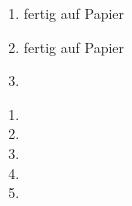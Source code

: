 \documentclass{homework}
\date{Montag, dem 19. November 2012}
\author{Stefan Meißner (4279113) und Niels Hoppe (4356370)}
\begin{document}
\maketitle
\begin{enumerate} 

\begin{enumerate}
\item fertig auf Papier
\item fertig auf Papier
\item
\end{enumerate}

\begin{enumerate}
\item
\item
\item
\item
\item
\end{enumerate}


\end{enumerate}
\end{document}
